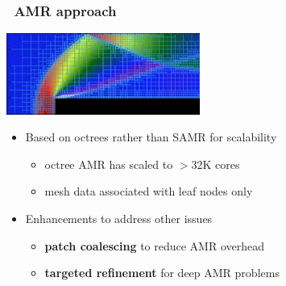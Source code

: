 \begin{frame}[fragile] 
\frametitle{\cello\ AMR approach}
\centerline{\includegraphics[width=2.5in]{paramesh2.png}}
\begin{itemize}
 \item  Based on octrees rather than SAMR for scalability
\begin{itemize}
 \item    octree AMR has scaled to $>$32K cores
 \item    mesh data associated with leaf nodes only
\end{itemize}
 \item Enhancements to address other issues
\begin{itemize}
 \item   \textbf{patch coalescing} to reduce AMR overhead
 \item   \textbf{targeted refinement} for deep AMR problems
\end{itemize}
\end{itemize}
\end{frame}

